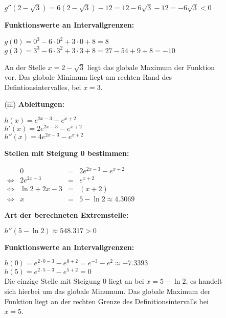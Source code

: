 \documentclass[a4paper,11pt]{scrartcl}
\newcommand{\bra}[1]{\left(#1\right)}
\newcommand{\step}[1]{\textbf{#1}}
\begin{document}
\begin{enumerate}
\begin{enumerate}
\begin{enumerate}
                \( g''(2 - \sqrt{3}) = 6 \bra{2 - \sqrt{3}} - 12 = 12 - 6\sqrt{3} - 12 = - 6 \sqrt{3} < 0 \)

                \step{Funktionswerte an Intervallgrenzen:}

                \( g(0) = 0^3 - 6 \cdot 0^2 + 3 \cdot 0 + 8 = 8 \)\\
                \( g(3) = 3^3 - 6 \cdot 3^2 + 3 \cdot 3 + 8 = 27 - 54 + 9 + 8 = -10 \)

                An der Stelle $x = 2 - \sqrt{3}$ liegt das globale Maximum der Funktion
                vor. Das globale Minimum liegt am rechten Rand des Defintionsintervalles,
                bei $x = 3$.

            \item[(iii)]
                \step{Ableitungen:}

                \( h(x) = e^{2x-3} - e^{x+2} \)\\
                \( h'(x) = 2e^{2x-3} - e^{x+2} \)\\
                \( h''(x) = 4e^{2x-3} - e^{x+2} \)

                \step{Stellen mit Steigung 0 bestimmen:}

                \(\begin{array}{rrcl}& 0 &=& 2e^{2x-3} - e^{x+2} \\
                \Leftrightarrow& 2e^{2x-3} &=& e^{x+2}\\
                \Leftrightarrow& \ln 2 + 2x - 3 &=& \bra{x+2} \\
                \Leftrightarrow& x &=& 5 - \ln 2 \approx 4.3069
                \end{array}\)

                \step{Art der berechneten Extremstelle:}

                \( h''(5 - \ln 2) \approx 548.317 > 0 \)

                \step{Funktionswerte an Intervallgrenzen:}

                \( h(0) = e^{2\cdot0 - 3} - e^{0 + 2} = e^{-3} - e^2 \approx -7.3393 \)\\
                \( h(5) = e^{2\cdot5 - 3} - e^{5 + 2} = 0 \)\\

                Die einzige Stelle mit Steigung 0 liegt an bei $x = 5 - \ln 2$, es handelt
                sich hierbei um das globale Minumum. Das globale Maximum der Funktion
                liegt an der rechten Grenze des Definitionsintervalls bei $x = 5$.

        \end{enumerate}
    \end{enumerate}
\end{enumerate}
\end{document}
